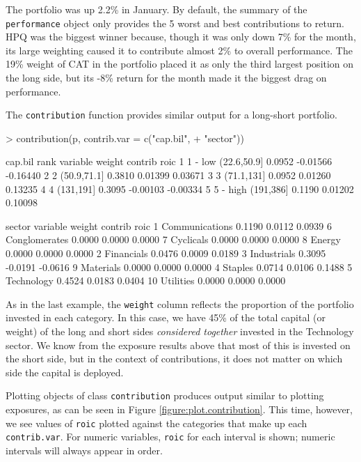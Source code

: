 \documentclass[a4paper]{report}
\begin{document}
\begin{article}
The portfolio was up 2.2\% in January. By default, the summary of the
\texttt{performance} object only provides the 5 worst and best
contributions to return. HPQ was the biggest winner because, though it
was only down 7\% for the month, its large weighting caused it to
contribute almost 2\% to overall performance. The 19\% weight of CAT
in the portfolio placed it as only the third largest position on the
long side, but its -8\% return for the month made it the biggest drag
on performance.

The \texttt{contribution} function provides similar output for a
long-short portfolio.

\begin{Schunk}
\begin{Sinput}
> contribution(p, contrib.var = c("cap.bil", 
+     "sector"))
\end{Sinput}
\begin{Soutput}
cap.bil 
      rank    variable weight  contrib     roic
1  1 - low (22.6,50.9] 0.0952 -0.01566 -0.16440
2        2 (50.9,71.1] 0.3810  0.01399  0.03671
3        3  (71.1,131] 0.0952  0.01260  0.13235
4        4   (131,191] 0.3095 -0.00103 -0.00334
5 5 - high   (191,386] 0.1190  0.01202  0.10098

sector 
         variable weight contrib    roic
1  Communications 0.1190  0.0112  0.0939
6   Conglomerates 0.0000  0.0000  0.0000
7       Cyclicals 0.0000  0.0000  0.0000
8          Energy 0.0000  0.0000  0.0000
2      Financials 0.0476  0.0009  0.0189
3     Industrials 0.3095 -0.0191 -0.0616
9       Materials 0.0000  0.0000  0.0000
4         Staples 0.0714  0.0106  0.1488
5      Technology 0.4524  0.0183  0.0404
10      Utilities 0.0000  0.0000  0.0000
\end{Soutput}
\end{Schunk}

As in the last example, the \texttt{weight} column reflects the
proportion of the portfolio invested in each category.  In this case,
we have 45\% of the total capital (or weight) of the long and short
sides \emph{considered together} invested in the Technology sector. We
know from the exposure results above that most of this is invested on
the short side, but in the context of contributions, it does not
matter on which side the capital is deployed.

Plotting objects of class \texttt{contribution} produces output
similar to plotting exposures, as can be seen in Figure
\ref{figure:plot.contribution}.  This time, however, we see values of
\texttt{roic} plotted against the categories that make up each
\texttt{contrib.var}.  For numeric variables, \texttt{roic} for each
interval is shown; numeric intervals will always appear in order.


\end{article}
\end{document}
